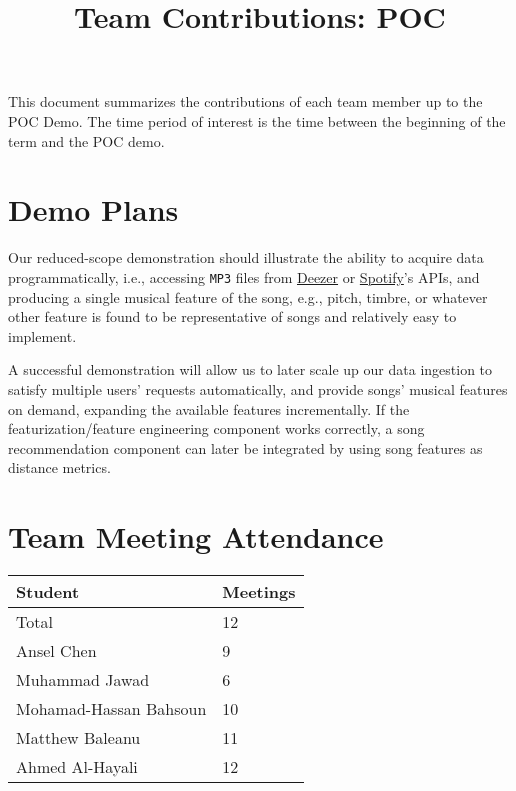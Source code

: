 \documentclass{article}
\title{Team Contributions: POC\\\progname}
\author{\authname}
\date{}
\begin{document}
\maketitle

This document summarizes the contributions of each team member up to the POC
Demo.  The time period of interest is the time between the beginning of the term
and the POC demo.

\section{Demo Plans}

\begin{description}[leftmargin=0cm]
    \item[Demonstration] Our reduced-scope demonstration should illustrate the ability to acquire data programmatically, i.e., accessing \texttt{MP3} files from \href{https://developers.deezer.com/api}{Deezer} or \href{https://developer.spotify.com/documentation/web-api}{Spotify}'s APIs, and producing a single musical feature of the song, e.g., pitch, timbre, or whatever other feature is found to be representative of songs and relatively easy to implement.
    \item[Post-demonstration] A successful demonstration will allow us to later scale up our data ingestion to satisfy multiple users' requests automatically, and provide songs' musical features on demand, expanding the available features incrementally. If the featurization/feature engineering component works correctly, a song recommendation component can later be integrated by using song features as distance metrics.
\end{description}

\section{Team Meeting Attendance}

\begin{table}[H]
\centering
\begin{tabular}{ll}
\toprule
\textbf{Student} & \textbf{Meetings}\\
\midrule
Total & 12\\
Ansel Chen & 9\\
Muhammad Jawad & 6\\
Mohamad-Hassan Bahsoun & 10\\
Matthew Baleanu & 11\\
Ahmed Al-Hayali & 12\\
\bottomrule
\end{tabular}
\end{table}
\end{document}
